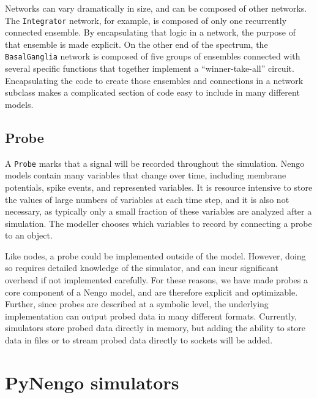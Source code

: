 \documentclass{frontiersSCNS}
\begin{document}
Networks can vary dramatically in size,
and can be composed of other networks.
The \texttt{Integrator} network, for example,
is composed of only one recurrently connected ensemble.
By encapsulating that logic in a network,
the purpose of that ensemble is made explicit.
On the other end of the spectrum,
the \texttt{BasalGanglia} network
is composed of five groups of ensembles
connected with several specific functions
that together implement a ``winner-take-all'' circuit.
Encapsulating the code to create those ensembles
and connections in a network subclass
makes a complicated section of code
easy to include in many different models.

\subsection{Probe}

A \texttt{Probe} marks that a signal
will be recorded
throughout the simulation.
Nengo models contain many variables
that change over time,
including membrane potentials,
spike events, and represented variables.
It is resource intensive to store the values of
large numbers of variables
at each time step, and it is also not necessary,
as typically only a small fraction
of these variables are analyzed after a simulation.
The modeller chooses which variables to
record by connecting a probe to an object.

Like nodes, a probe could be implemented
outside of the model.
However, doing so requires detailed knowledge
of the simulator,
and can incur significant overhead
if not implemented carefully.
For these reasons, we have made probes
a core component of a Nengo model,
and are therefore explicit
and optimizable.
Further, since probes are described
at a symbolic level,
the underlying implementation
can output probed data in many different formats.
Currently, simulators store probed data
directly in memory,
but adding the ability to store data
in files or to stream probed data
directly to sockets will be added.

\section{PyNengo simulators} \label{sec:simulators}
\end{document}
